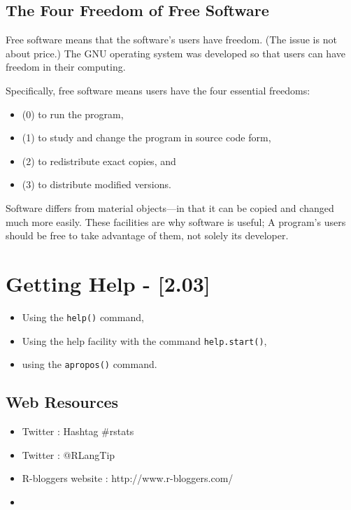 \documentclass[a4paper,12pt]{article}
\begin{document}
\newpage
\subsection*{The Four Freedom of Free Software}
Free software means that the software's users have freedom. (The issue is not about price.) The GNU operating system was developed so that users can have freedom in their computing.

Specifically, free software means users have the four essential freedoms: 
\begin{itemize}
\item(0) to run the program, 
\item(1) to study and change the program in source code form, 
\item(2) to redistribute exact copies, and 
\item(3) to distribute modified versions.
\end{itemize}

Software differs from material objects—in that it can be copied and changed much more easily. These facilities are why software is useful; A program's users should be free to take advantage of them, not solely its developer.


\newpage
\section*{Getting Help - [2.03]}

\begin{itemize}
\item Using the \texttt{help()} command,
\item Using the help facility with the command \texttt{help.start()},
\item using the \texttt{apropos()} command.
\end{itemize}

\subsection*{Web Resources}
\begin{itemize}
\item Twitter : Hashtag \#rstats
\item Twitter : @RLangTip
\item R-bloggers website : http://www.r-bloggers.com/
\item 
\end{itemize}
\newpage
\end{document}
